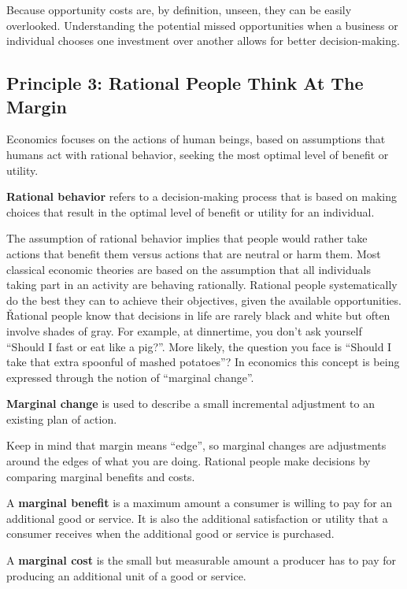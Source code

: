 Because opportunity costs are, by definition, unseen, they can be easily overlooked. Understanding the potential
missed opportunities when a business or individual chooses one investment over another allows for better
decision-making.

\subsection*{Principle 3: Rational People Think At The Margin}

Economics focuses on the actions of human beings, based on assumptions that humans act with rational behavior,
seeking the most optimal level of benefit or utility.

\textbf{Rational behavior} refers to a decision-making process that is based on making choices that result in the
optimal level of benefit or utility for an individual.
\ed

The assumption of rational behavior implies that people would rather take actions that benefit them versus actions
that are neutral or harm them. Most classical economic theories are based on the assumption that all individuals
taking part in an activity are behaving rationally. Rational people systematically do the best they can to achieve
their objectives, given the available opportunities. \v

Rational people know that decisions in life are rarely black and white but often involve shades of gray. For example,
at dinnertime, you don't ask yourself ``Should I fast or eat like a pig?''. More likely, the question you face is
``Should I take that extra spoonful of mashed potatoes''? In economics this concept is being expressed through the
notion of ``marginal change''.

\textbf{Marginal change} is used to describe a small incremental adjustment to an existing plan of action.
\ed

Keep in mind that margin means ``edge'', so marginal changes are adjustments around the edges of what you are doing.
Rational people make decisions by comparing marginal benefits and costs.

A \textbf{marginal benefit} is a maximum amount a consumer is willing to pay for an additional good or service. It is
also the additional satisfaction or utility that a consumer receives when the additional good or service is purchased.
\ed

A \textbf{marginal cost} is the small but measurable amount a producer has to pay for producing an additional unit of a
good or service.
\ed

